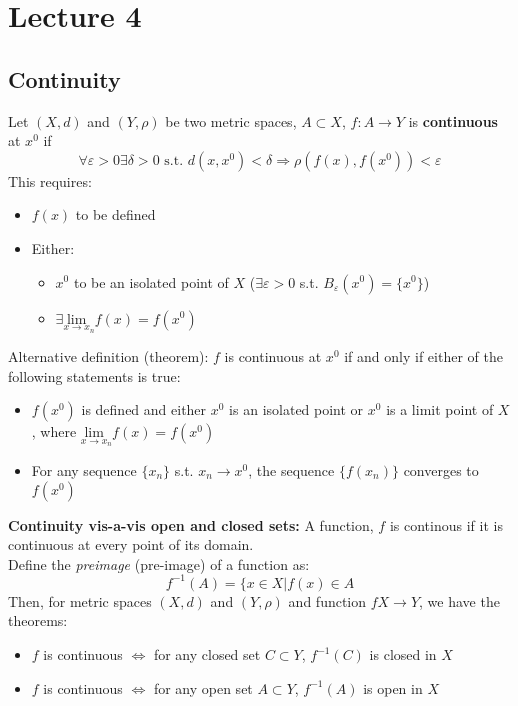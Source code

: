 \documentclass{article}
\newcommand{\xlmt}{\underset{x\rightarrow x_n}{\text{lim }}}
\begin{document}

\section{Lecture 4}

\subsection{Continuity}
Let $(X,d)$ and $(Y,\rho)$ be two metric spaces, $A\subset X$, $f:A\rightarrow Y$ is \textbf{continuous} at $x^0$ if
\[
	\forall\varepsilon>0\exists\delta>0\text{ s.t. }d(x,x^0)<\delta\Rightarrow\rho(f(x),f(x^0))<\varepsilon
\]
This requires:
\begin{itemize}
	\item $f(x)$ to be defined 
	\item Either:
		\begin{itemize}
			\item $x^0$ to be an isolated point of $X$ ($\exists\varepsilon>0$ s.t. $B_\varepsilon(x^0)=\{x^0\}$)
			\item $\exists \xlmt f(x)=f(x^0)$
		\end{itemize}
\end{itemize}
Alternative definition (theorem): $f$ is continuous at $x^0$ if and only if either of the following statements is true:
\begin{itemize}
	\item $f(x^0)$ is defined and either $x^0$ is an isolated point or $x^0$ is a limit point of $X$, where $\xlmt f(x)=f(x^0)$
	\item For any sequence $\{x_n\}$ s.t. $x_n\rightarrow x^0$, the sequence $\{f(x_n)\}$ converges to $f(x^0)$
\end{itemize}
\medskip
\textbf{Continuity vis-a-vis open and closed sets:}
A function, $f$ is continous if it is continuous at every point of its domain.
\smallskip \\
Define the \textit{preimage} (pre-image) of a function as: \[ f^{-1}(A) = \{x\in X|f(x)\in A \]
Then, for metric spaces $(X,d)$ and $(Y,\rho)$ and function $f X\rightarrow Y$, we have the theorems:
\begin{itemize}
	\item $f$ is continuous $\iff$ for any closed set $C\subset Y$, $f^{-1}(C)$ is closed in $X$ 
	\item $f$ is continuous $\iff$ for any open set $A\subset Y$, $f^{-1}(A)$ is open in $X$
\end{itemize}
\end{document}
